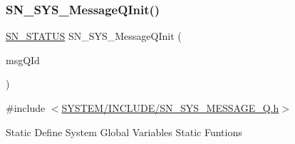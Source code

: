 \subsubsection{\texorpdfstring{S\+N\+\_\+\+S\+Y\+S\+\_\+\+Message\+Q\+Init()}{SN\_SYS\_MessageQInit()}}
{\footnotesize\ttfamily \hyperlink{group__SYSTEM__ERROR_ga4540713b9a7a18ce44d78c3a10f7442f}{S\+N\+\_\+\+S\+T\+A\+T\+US} S\+N\+\_\+\+S\+Y\+S\+\_\+\+Message\+Q\+Init (\begin{DoxyParamCaption}\item[{\hyperlink{structsys__message__queue}{sys\+Message\+Q\+Id} $\ast$}]{msg\+Q\+Id }\end{DoxyParamCaption})}



{\ttfamily \#include $<$\hyperlink{SN__SYS__MESSAGE__Q_8h}{S\+Y\+S\+T\+E\+M/\+I\+N\+C\+L\+U\+D\+E/\+S\+N\+\_\+\+S\+Y\+S\+\_\+\+M\+E\+S\+S\+A\+G\+E\+\_\+\+Q.\+h}$>$}

Static Define System Global Variables Static Funtions 